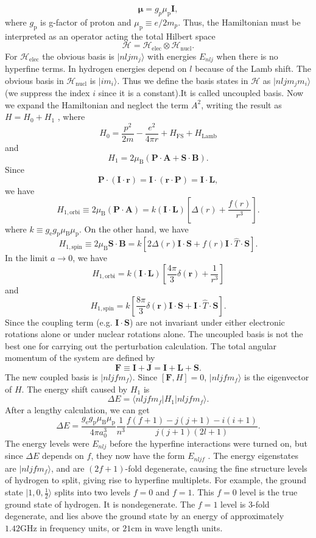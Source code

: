 \[\bm{\mu} = g_{p} \mu_{\mathrm{p}} \bm{I},\]
where $g_{\mathrm{p}}$ is g-factor of proton and $\mu_{\mathrm{p}} \equiv {e}/{2m_p}$. 
Thus, the Hamiltonian must be interpreted as an operator acting the total Hilbert space
\[\mathcal{H} = \mathcal{H}_{\mathrm{elec}} \otimes \mathcal{H}_{\mathrm{nucl}}.\]
For $\mathcal{H}_{\mathrm{elec}}$ the obvious basis is $|nljm_j\rangle$ with energies $E_{nlj}$ when there is no hyperfine terms. In hydrogen energies depend on $l$ because of the Lamb shift. The obvious basis in $\mathcal{H}_{\mathrm{nucl}}$ is $|im_i\rangle$. Thus we define the basis states in $\mathcal{H}$ as $|nljm_jm_i\rangle$ (we suppress the index $i$ since it is a constant).It is called uncoupled basis. Now we expand the Hamiltonian and neglect the term $A^2$, writing the result as $H = H_0 + H_1$ , where
\[H_0 = \frac{p^2}{2m} - \frac{e^2}{4\pi r}  + H_{\mathrm{FS}} + H_{\mathrm{Lamb}}\]
and
\[H_1 = 2\mu_{\mathrm{B}}(\bm{P}\cdot\bm{A} + \bm{S}\cdot\bm{B}).\]
Since
\[\bm{P}\cdot(\bm{I}\cdot\bm{r}) = \bm{I}\cdot(\bm{r}\cdot\bm{P}) = \bm{I}\cdot\bm{L},\]
we have
\[H_{1,\mathrm{orbi}} \equiv 2\mu_{\mathrm{B}}(\bm{P}\cdot\bm{A}) = k(\bm{I}\cdot\bm{L}) \left[\Delta(r) + \frac{f(r)}{r^3}\right ].\]
where $k \equiv g_{\mathrm{e}}g_{\mathrm{p}}\mu_{\mathrm{B}}\mu_{\mathrm{p}}$.
On the other hand, we have
\[H_{1,\mathrm{spin}} \equiv 2\mu_{\mathrm{B}} \bm{S}\cdot\bm{B} = k\left [2\Delta(r)\bm{I}\cdot\bm{S} + f(r)\bm{I}\cdot\hat{T}\cdot\bm{S}\right ] .\]
In the limit $a \to 0$, we have
\[H_{1,\mathrm{orbi}} = k(\bm{I}\cdot\bm{L}) \left[\frac{4\pi}{3}\delta(\bm{r}) + \frac{1}{r^3}\right ]\]
and
\[H_{1,\mathrm{spin}}  = k\left [\frac{8\pi}{3}\delta(\bm{r})\bm{I}\cdot\bm{S} + \bm{I}\cdot\hat{T}\cdot\bm{S}\right ] .\]
Since the coupling term (e.g. $\bm{I}\cdot\bm{S}$) are not invariant under either electronic rotations alone or under nuclear rotations alone. The uncoupled basis is not the best one for carrying out the perturbation calculation. The total angular momentum of the system are defined by
\[\bm{F} \equiv \bm{I} + \bm{J} = \bm{I} + \bm{L} + \bm{S}.\]
The new coupled basis is $|nljfm_f\rangle$. Since $[\bm{F},H] = 0$, $|nljfm_f\rangle$ is the eigenvector of $H$. The energy shift caused by $H_1$ is
\[\Delta E = \langle nljfm_f | H_1 | nljfm_f\rangle.\]
After a lengthy calculation, we can get
\[\Delta E = \frac{g_{\mathrm{e}}g_{\mathrm{p}}\mu_{\mathrm{B}}\mu_{\mathrm{p}}}{4\pi a_0^3} \frac{1}{n^3} \frac{f(f+1)-j(j+1)-i(i+1)}{j(j+1)(2l+1)} .\]
The energy levels were $E_{nlj}$ before the hyperfine interactions were turned on, but since $\Delta E$ depends on $f$, they now have the form $E_{nljf}$ . The energy eigenstates are $|nljfm_f\rangle$, and are $(2f+1)$-fold degenerate, causing the fine structure levels of hydrogen to split, giving rise to hyperfine multiplets. 
For example, the ground state $|1,0,\frac{1}{2}\rangle$ splits into two levels $f = 0$ and $f = 1$. This $f = 0$ level is the true ground state of hydrogen. It is nondegenerate. The $f=1$ level is 3-fold degenerate, and lies above the ground state by an energy of approximately $1.42 \mathrm{GHz}$ in frequency
units, or $21 \mathrm{cm}$ in wave length units.

